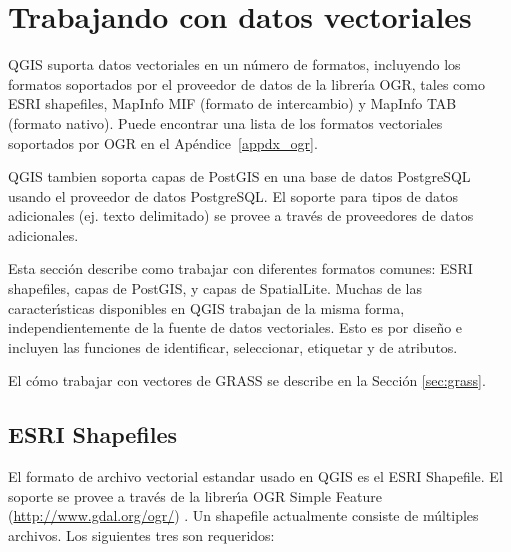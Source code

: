 
\section{Trabajando con datos vectoriales}\label{label_workingvector}



QGIS suporta datos vectoriales en un n\'umero de formatos, incluyendo los formatos soportados por el proveedor de datos de la librer\'{\i}a OGR, tales como ESRI shapefiles,
MapInfo MIF (formato de intercambio)
y MapInfo TAB (formato nativo).
Puede encontrar una lista de los formatos vectoriales soportados por OGR en el Ap\'endice~\ref{appdx_ogr}.

QGIS tambien soporta capas de PostGIS en una base de datos PostgreSQL usando el proveedor de datos PostgreSQL. El soporte para tipos de datos adicionales (ej. texto delimitado) se provee a trav\'es de proveedores de datos adicionales.

Esta secci\'on describe como trabajar con diferentes formatos comunes:
ESRI shapefiles, capas de PostGIS, y capas de SpatialLite. Muchas de las caracter\'{\i}sticas disponibles en QGIS trabajan de la misma forma, independientemente de la fuente de datos vectoriales.
Esto es por dise\~no e incluyen las funciones de identificar, seleccionar, etiquetar y de atributos.

El c\'omo trabajar con vectores de GRASS se describe en la Secci\'on \ref{sec:grass}.

\subsection{ESRI Shapefiles}

El formato de archivo vectorial estandar usado en QGIS es el ESRI Shapefile. El soporte se provee a trav\'es de la librer\'{\i}a OGR Simple Feature (\url{http://www.gdal.org/ogr/})
. Un shapefile actualmente consiste de m\'ultiples archivos. Los siguientes tres son requeridos:

